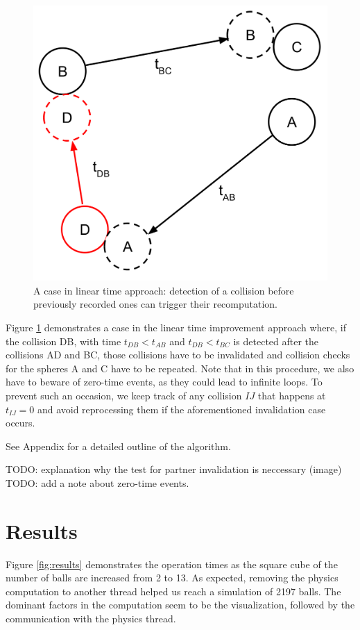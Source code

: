 \documentclass[journal, letterpaper]{IEEEtran}
\begin{document}
\begin{figure}[ht!] 
  \centering
  \includegraphics[width=0.7\linewidth]{invalidatePartners.png}
  \caption{A case in linear time approach: detection of a collision before previously recorded ones can trigger their recomputation.}
  \label{fig:invalidate}
\end{figure}

Figure \ref{fig:invalidate} demonstrates a case in the linear time improvement approach where, if
the collision DB, with time $t_{DB} < t_{AB}$ and $t_{DB} < t_{BC}$ is detected after the collisions
AD and BC, those collisions have to be invalidated and collision checks for the spheres A and C have 
to be repeated. Note that in this procedure, we also have to beware of zero-time events, as they could
lead to infinite loops. To prevent such an occasion, we keep track of any collision $IJ$ that happens at $t_{IJ} = 0$
and avoid reprocessing them if the aforementioned invalidation case occurs. 

See Appendix for a detailed outline of the algorithm.
  
TODO: explanation why the test for partner invalidation is neccessary (image)
TODO: add a note about zero-time events.

\section{Results}

Figure \ref{fig:results} demonstrates the operation times as the square cube of the number of balls are increased from 2 to 13. 
As expected, removing the physics computation to another thread helped us reach a simulation of 2197 balls. The dominant
factors in the computation seem to be the visualization, followed by the communication with the physics thread.
\end{document}

